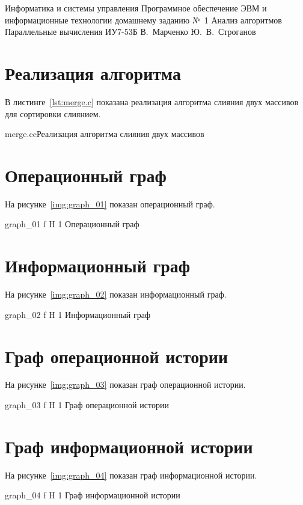 \documentclass{bmstu}
\begin{document}
\makereporttitle
    {Информатика и системы управления}
    {Программное обеспечение ЭВМ и информационные технологии}
    {домашнему заданию №~1}
    {Анализ алгоритмов}
    {Параллельные вычисления}
    {}
    {ИУ7-53Б}
    {В.~Марченко}
    {Ю.~В.~Строганов}
    {}

\maketableofcontents

\chapter{Реализация алгоритма}

В листинге~\ref{lst:merge.c} показана реализация алгоритма слияния двух массивов для сортировки слиянием.

{merge.c}{c}{Реализация алгоритма слияния двух массивов}

\chapter{Операционный граф}

На рисунке~\ref{img:graph_01} показан операционный граф.

    {graph_01}
    {f}
    {H}
    {1\textwidth}
    {Операционный граф}

\chapter{Информационный граф}

На рисунке~\ref{img:graph_02} показан информационный граф.

    {graph_02}
    {f}
    {H}
    {1\textwidth}
    {Информационный граф}

\chapter{Граф операционной истории}

На рисунке~\ref{img:graph_03} показан граф операционной истории.

    {graph_03}
    {f}
    {H}
    {1\textwidth}
    {Граф операционной истории}

\chapter{Граф информационной истории}

На рисунке~\ref{img:graph_04} показан граф информационной истории.

    {graph_04}
    {f}
    {H}
    {1\textwidth}
    {Граф информационной истории}
\end{document}
